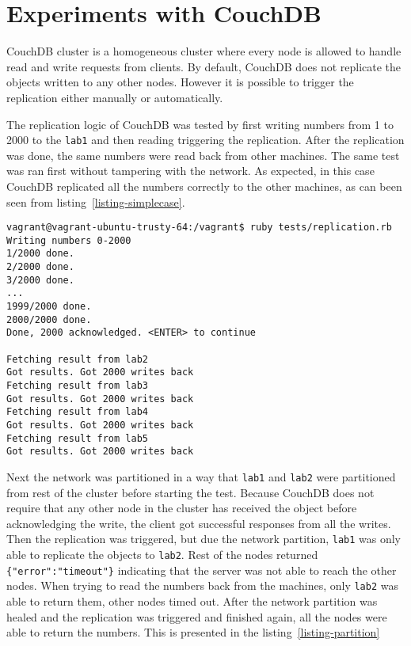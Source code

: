 \section{Experiments with CouchDB}

CouchDB cluster is a homogeneous cluster where every node is allowed to handle
read and write requests from clients. By default, CouchDB does not replicate the
objects written to any other nodes. However it is possible to trigger the
replication either manually or automatically.

The replication logic of CouchDB was tested by first writing numbers from 1 to
2000 to the \texttt{lab1} and then reading triggering the replication. After the
replication was done, the same numbers were read back from other machines. The
same test was ran first without tampering with the network. As expected, in this
case CouchDB replicated all the numbers correctly to the other machines, as can
been seen from listing~\ref{listing-simplecase}.

\begin{lstlisting}[caption={CouchDB replication without network anomalities},label={listing-simplecase}]
vagrant@vagrant-ubuntu-trusty-64:/vagrant$ ruby tests/replication.rb
Writing numbers 0-2000
1/2000 done.
2/2000 done.
3/2000 done.
...
1999/2000 done.
2000/2000 done.
Done, 2000 acknowledged. <ENTER> to continue

Fetching result from lab2
Got results. Got 2000 writes back
Fetching result from lab3
Got results. Got 2000 writes back
Fetching result from lab4
Got results. Got 2000 writes back
Fetching result from lab5
Got results. Got 2000 writes back
\end{lstlisting}

Next the network was partitioned in a way that \texttt{lab1} and \texttt{lab2}
were partitioned from rest of the cluster before starting the test. Because
CouchDB does not require that any other node in the cluster has received the
object before acknowledging the write, the client got successful responses from
all the writes. Then the replication was triggered, but due the network
partition, \texttt{lab1} was only able to replicate the objects to
\texttt{lab2}. Rest of the nodes returned \texttt{\{"error":"timeout"\}}
indicating that the server was not able to reach the other nodes. When trying to
read the numbers back from the machines, only \texttt{lab2} was able to return
them, other nodes timed out. After the network partition was healed and the
replication was triggered and finished again, all the nodes were able to return
the numbers. This is presented in the listing~\ref{listing-partition}

